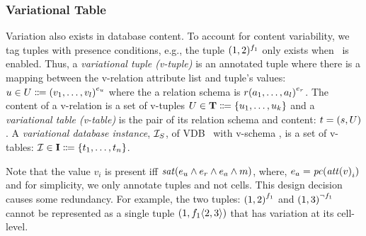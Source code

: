 \subsubsection{Variational Table}
\label{sec:vtab}


Variation also exists in database content. To account 
for content variability, we tag tuples with 
presence conditions, e.g., the tuple $(1,2)^{\A}$ only exists
when \A\  is enabled. 
%
Thus, a \emph{variational tuple (v-tuple)} is an annotated tuple where 
there is a mapping between the v-relation attribute list and  tuple's values:
\ensuremath{
\vTuple \in \vRelCont \eqq \annot  [\dimMeta_\vTuple] {(\vi v \numAtts)}
} where the a relation schema is 
\ensuremath{
\vRel  \annot [\dimMeta_\vRel] {(\vi \vAtt \numAtts)}
}.
%
The content of a v-relation
is a set of v-tuples 
$ \vRelCont \in \vRelContSet \eqq \setDef {\vi \vTuple \numTuples}$
and 
%
a  \emph{variational table (v-table)} is the pair of its relation schema and content: 
\ensuremath{
\vTab = (\vRelSch, \vRelCont)
}.
%
A \emph{variational database instance}, \ensuremath{\vdbInst_\vSch}, 
of VDB \vDB\ with v-schema \vSch, 
is a set of v-tables: 
$\synDef \vdbInst  \vdbInstSet \eqq \setDef {\vi \vTab \numRels} $.
%

Note that the value $v_i$ is present iff 
$\sat {\dimMeta_\vTuple \wedge \dimMeta_\vRel \wedge \dimMeta_\vAtt \wedge \fModel}$,
where, 
$\dimMeta_\vAtt = \getPC {\getAtt v_i}$ and
%
for simplicity, 
we only annotate tuples and not cells. 
This design decision causes some redundancy.
For example, the two tuples: 
\ensuremath{\annot [\fOne] {(1,2)}} and \ensuremath{\annot [\neg\fOne] {(1,3)}}
cannot be represented as a single tuple \ensuremath{(1, \chc [\fOne] {2,3})} 
that has variation at its cell-level.
%

